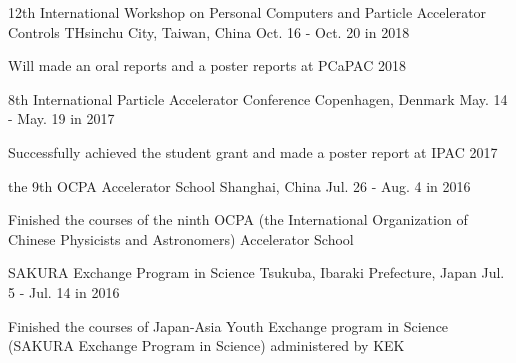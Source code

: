 

\begin{cventries}

  \cventry
    {} %
    {12th International Workshop on Personal Computers and Particle Accelerator Controls} %
    {THsinchu City, Taiwan, China} %
    {Oct. 16 - Oct. 20 in 2018} %
    {
        \begin{cvitems} %
            \item {Will made an oral reports and a poster reports at PCaPAC 2018}
        \end{cvitems}    
    }

  \cventry
    {} %
    {8th International Particle Accelerator Conference} %
    {Copenhagen, Denmark} %
    {May. 14 - May. 19 in 2017} %
    {
        \begin{cvitems} %
            \item {Successfully achieved the student grant and made a poster report at IPAC 2017}
        \end{cvitems}    
    }

  \cventry
    {} %
    {the 9th OCPA Accelerator School} %
    {Shanghai, China} %
    {Jul. 26 - Aug. 4 in 2016} %
    {
        \begin{cvitems} %
            \item {Finished the courses of the ninth OCPA (the International Organization of Chinese Physicists and Astronomers) Accelerator School }
        \end{cvitems}
    }

  \cventry
    {} %
    {SAKURA Exchange Program in Science} %
    {Tsukuba, Ibaraki Prefecture, Japan} %
    {Jul. 5 - Jul. 14 in 2016} %
    {
        \begin{cvitems} %
            \item {Finished the courses of Japan-Asia Youth Exchange program in Science (SAKURA Exchange Program in Science) administered by KEK}
        \end{cvitems}
    }

\end{cventries}
